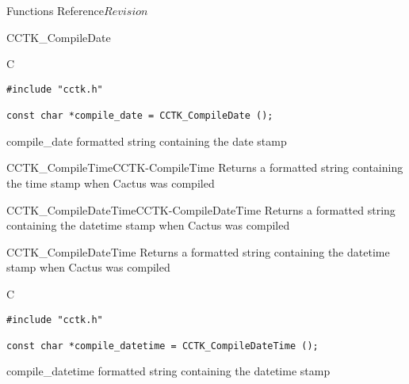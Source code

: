 \begin{cactuspart}{ Functions Reference}{}{$Revision$}
\begin{FunctionDescription}{CCTK\_CompileDate}
\begin{SynopsisSection}
\begin{Synopsis}{C}
\begin{verbatim}
#include "cctk.h"

const char *compile_date = CCTK_CompileDate ();
\end{verbatim}
\end{Synopsis}
\end{SynopsisSection}

\begin{ResultSection}
\begin{Result}{compile\_date}
formatted string containing the date stamp
\end{Result}
\end{ResultSection}

\begin{SeeAlsoSection}
\begin{SeeAlso2}{CCTK\_CompileTime}{CCTK-CompileTime}
  Returns a formatted string containing the time stamp when Cactus was compiled
\end{SeeAlso2}
\begin{SeeAlso2}{CCTK\_CompileDateTime}{CCTK-CompileDateTime}
  Returns a formatted string containing the datetime stamp when Cactus was compiled
\end{SeeAlso2}
\end{SeeAlsoSection}
\end{FunctionDescription}


\begin{FunctionDescription}{CCTK\_CompileDateTime}
\label{CCTK-CompileDateTime}
Returns a formatted string containing the datetime stamp when Cactus was compiled

\begin{SynopsisSection}
\begin{Synopsis}{C}
\begin{verbatim}
#include "cctk.h"

const char *compile_datetime = CCTK_CompileDateTime ();
\end{verbatim}
\end{Synopsis}
\end{SynopsisSection}

\begin{ResultSection}
\begin{Result}{compile\_datetime}
formatted string containing the datetime stamp
\end{Result}
\end{ResultSection}


\end{FunctionDescription}
\end{cactuspart}
